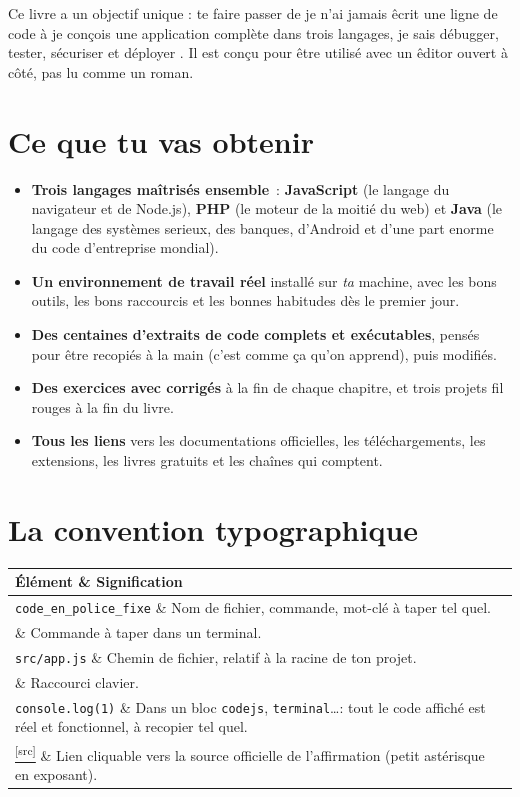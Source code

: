 \documentclass[12pt,a4paper,twoside,openright]{book}
\makeatletter
\newcommand{\fichier}[1]{\texttt{\color{pathgreen}#1}}
\providecommand{\cmd}[1]{}%
\renewcommand{\cmd}[1]{\srcbox{\texttt{\detokenize{#1}}}}
\newcommand{\src}[1]{\href{#1}{\textcolor{linkblue}{\textsuperscript{[src]}}}}
\newcommand{\langjs}{\textcolor{javared}{\textbf{JavaScript}}}
\newcommand{\langphp}{\textcolor{phppurple}{\textbf{PHP}}}
\newcommand{\langjava}{\textcolor{themecolor}{\textbf{Java}}}
\newenvironment{tabz}[1]{\rowcolors{2}{white}{tralight}%
  \small\setlength{\tabcolsep}{5pt}\setlength{\LTpre}{3pt}\setlength{\LTpost}{3pt}%
  \begin{longtable}{@{}#1@{}}\toprule}
  {\bottomrule\end{longtable}\normalfont\setlength{\tabcolsep}{6pt}}
\newcommand{\thd}[1]{\textbf{\color{white}#1}}
\newcommand{\headrow}{\rowcolor{theadbg}}
\makeatother
\begin{document}
Ce livre a un objectif unique : te faire passer de \og je n'ai jamais \^ecrit une ligne de
code \fg{} \`a \og je con\c{c}ois une application compl\`ete dans trois langages, je sais d\'ebugger,
tester, s\'ecuriser et d\'eployer \fg{}. Il est con\c{c}u pour \^etre utilis\'e avec un \^editor ouvert
\`a c\^ot\'e, pas lu comme un roman.

\section{Ce que tu vas obtenir}

\begin{objectif}
\begin{itemize}
  \item \textbf{Trois langages ma\^itris\'es ensemble}~: \langjs{} (le langage du navigateur et de
        Node.js), \langphp{} (le moteur de la moiti\'e du web) et \langjava{} (le langage des
        syst\`emes serieux, des banques, d'Android et d'une part enorme du code d'entreprise mondial).
  \item \textbf{Un environnement de travail r\'eel} install\'e sur \emph{ta} machine, avec les bons
        outils, les bons raccourcis et les bonnes habitudes d\`es le premier jour.
  \item \textbf{Des centaines d'extraits de code complets et ex\'ecutables}, pens\'es pour \^etre
        recopi\'es \`a la main (c'est comme \c{c}a qu'on apprend), puis modifi\'es.
  \item \textbf{Des exercices avec corrig\'es} \`a la fin de chaque chapitre, et trois projets
        fil rouges \`a la fin du livre.
  \item \textbf{Tous les liens} vers les documentations officielles, les t\'el\'echargements, les
        extensions, les livres gratuits et les cha\^ines qui comptent.
\end{itemize}
\end{objectif}

\section{La convention typographique}

\begin{tabz}{p{}X}
  \headrow \thd{\'El\'ement} \& \thd{Signification} \\
  \midrule
  \verb|code_en_police_fixe| \& Nom de fichier, commande, mot-cl\'e \`a taper tel quel.\\
  \cmd{npm install} \& Commande \`a taper dans un terminal.\\
  \fichier{src/app.js} \& Chemin de fichier, relatif \`a la racine de ton projet.\\
  \keys{Ctrl + S} \& Raccourci clavier.\\
  \verb|console.log(1)| \& Dans un bloc \texttt{codejs}, \texttt{terminal}\dots : tout le code
  affich\'e est r\'eel et fonctionnel, \`a recopier tel quel.\\
  \src{https://developer.mozilla.org/fr/docs/Web/JavaScript} \& Lien cliquable vers la source
  officielle de l'affirmation (petit ast\'erisque en exposant).\\
\end{tabz}
\end{document}

